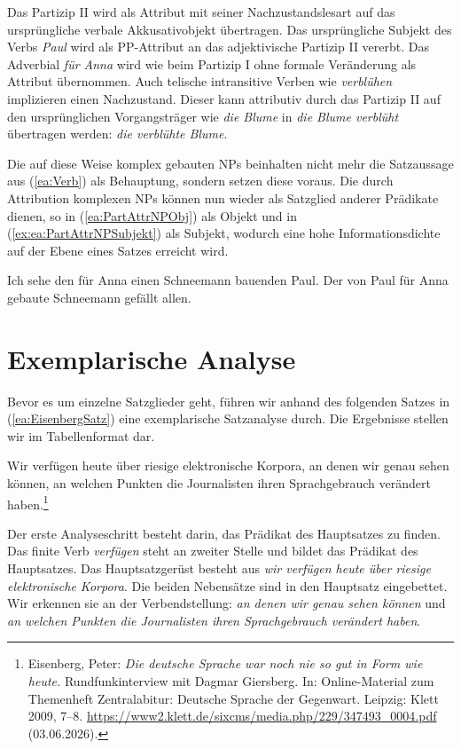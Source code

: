 Das Partizip II wird als Attribut mit seiner Nachzustandslesart auf das ursprüngliche verbale Akkusativobjekt übertragen. Das ursprüngliche Subjekt des Verbs \textit{Paul} wird als PP-Attribut an das adjektivische Partizip II vererbt. Das Adverbial \textit{für Anna} wird wie beim Partizip I ohne formale Veränderung als Attribut übernommen. Auch telische intransitive Verben wie \textit{verblühen} implizieren einen Nachzustand. Dieser kann attributiv durch das Partizip II auf den ursprünglichen Vorgangsträger wie \textit{die Blume} in \textit{die Blume verblüht} übertragen werden: \textit{die verblühte Blume}.

Die auf diese Weise komplex gebauten NPs beinhalten nicht mehr die Satzaussage aus (\ref{ea:Verb}) als Behauptung, sondern setzen diese voraus. Die durch Attribution komplexen NPs können nun wieder als Satzglied anderer Prädikate dienen, so in (\ref{ea:PartAttrNPObj}) als Objekt und in (\ref{ex:ea:PartAttrNPSubjekt}) als Subjekt, wodurch eine hohe Informationsdichte auf der Ebene eines Satzes erreicht wird.

\ea \label{ea:PartAttrNP}
\ea \label{ea:PartAttrNPObj} Ich sehe den für Anna einen Schneemann bauenden Paul.
\ex \label{ex:ea:PartAttrNPSubjekt} Der von Paul für Anna gebaute Schneemann gefällt allen.
\z 
\z 



\section{Exemplarische Analyse}\label{section:exemplAnalyse}

Bevor es um einzelne Satzglieder geht, führen wir anhand des folgenden Satzes in (\ref{ea:EisenbergSatz}) eine exemplarische Satzanalyse durch. Die Ergebnisse stellen wir im Tabellenformat dar.

\ea \label{ea:EisenbergSatz} Wir verfügen heute über riesige elektronische Korpora, an denen wir genau sehen können, an welchen Punkten die Journalisten ihren Sprachgebrauch verändert haben.\footnote{Eisenberg, Peter: \textit{Die deutsche Sprache war noch nie so gut in Form wie heute.} Rundfunkinterview mit Dagmar Giersberg. In: Online-Material zum Themenheft Zentralabitur: Deutsche Sprache der Gegenwart. Leipzig: Klett 2009, 7--8. \url{https://www2.klett.de/sixcms/media.php/229/347493_0004.pdf} (03.06.2026).} 
\z 

Der erste Analyseschritt besteht darin, das Prädikat des Hauptsatzes zu finden. Das finite Verb \textit{verfügen} steht an zweiter Stelle und bildet das Prädikat des Hauptsatzes. Das Hauptsatzgerüst besteht aus \textit{wir verfügen heute über riesige elektronische Korpora}. Die beiden Nebensätze sind in den Hauptsatz eingebettet. Wir erkennen sie an der Verbendstellung: \textit{an denen wir genau sehen können} und \textit{an welchen Punkten die Journalisten ihren Sprachgebrauch verändert haben}.

